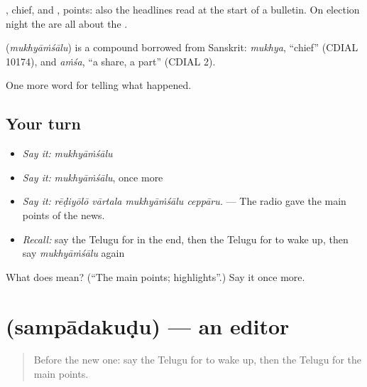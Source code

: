 , chief, and , points: also the headlines read at the start of a bulletin. On election night the  are all about the .

\begin{cousinweb}
\textbf{} (\emph{mukhyāṁśālu}) is a compound borrowed from Sanskrit: \emph{mukhya}, \textquotedblleft{}chief\textquotedblright{} (CDIAL 10174), and \emph{aṁśa}, \textquotedblleft{}a share, a part\textquotedblright{} (CDIAL 2).
\end{cousinweb}

\begin{grammarlens}[title={What you've built}]
One more word for telling what happened.
\end{grammarlens}

\subsection*{Your turn}
\begin{itemize}
\raggedright
  \item \emph{Say it:} \emph{mukhyāṁśālu}
  \item \emph{Say it:} \emph{mukhyāṁśālu}, once more
  \item \emph{Say it:} \emph{rēḍiyōlō vārtala mukhyāṁśālu ceppāru.} — The radio gave the main points of the news.
  \item \emph{Recall:} say the Telugu for in the end, then the Telugu for to wake up, then say \emph{mukhyāṁśālu} again
\end{itemize}

\begin{tcolorbox}[breakable,colback=teal!4,colframe=teal!35!black,title={Before you move on}]
What does  mean? (\textquotedblleft{}The main points; highlights\textquotedblright{}.) Say it once more.
\end{tcolorbox}
\section[\texorpdfstring{\te{సంపాదకుడు} (sampādakuḍu)}{సంపాదకుడు (sampādakuḍu)}]{ (sampādakuḍu) — an editor}

\label{lesson:TE-C341-sampadakudu}



\begin{quote}
Before the new one: say the Telugu for to wake up, then the Telugu for the main points.
\end{quote}

